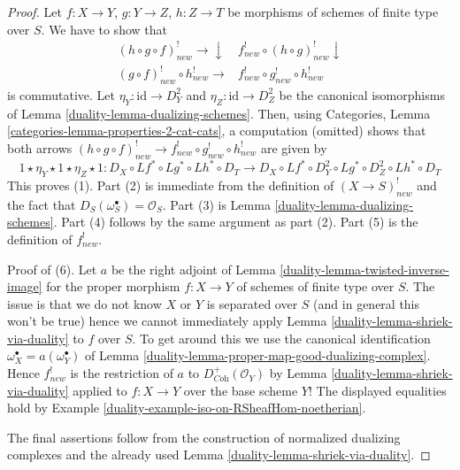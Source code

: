 \begin{proof}

Let $f : X \to Y$, $g : Y \to Z$, $h : Z \to T$ be morphisms of schemes
of finite type over $S$. We have to show that
$$
\begin{array}{cc}(h \circ g \circ f)^!_{new} \longrightarrow\downarrow & f^!_{new} \circ (h \circ g)^!_{new} \downarrow \\ (g \circ f)^!_{new} \circ h^!_{new} \longrightarrow & f^!_{new} \circ g^!_{new} \circ h^!_{new}\end{array}
$$
is commutative. Let $\eta_Y : \text{id} \to D_Y^2$
and $\eta_Z : \text{id} \to D_Z^2$ be the canonical isomorphisms
of Lemma \ref{duality-lemma-dualizing-schemes}. Then, using
Categories, Lemma \ref{categories-lemma-properties-2-cat-cats},
a computation (omitted) shows that both arrows
$(h \circ g \circ f)^!_{new} \to f^!_{new} \circ g^!_{new} \circ h^!_{new}$
are given by
$$
1 \star \eta_Y \star 1 \star \eta_Z \star 1 :
D_X \circ Lf^* \circ Lg^* \circ Lh^* \circ D_T
\longrightarrow
D_X \circ Lf^* \circ D_Y^2 \circ Lg^* \circ D_Z^2 \circ Lh^* \circ D_T
$$
This proves (1). Part (2) is immediate from the definition of
$(X \to S)^!_{new}$ and the fact that $D_S(\omega_S^\bullet) = \mathcal{O}_S$.
Part (3) is Lemma \ref{duality-lemma-dualizing-schemes}.
Part (4) follows by the same argument as part (2).
Part (5) is the definition of $f^!_{new}$.

\medskip\noindent
Proof of (6). Let $a$ be the
right adjoint of Lemma \ref{duality-lemma-twisted-inverse-image} for the
proper morphism $f : X \to Y$ of schemes of finite type over $S$.
The issue is that we do not know $X$ or $Y$ is
separated over $S$ (and in general this won't be true)
hence we cannot immediately apply
Lemma \ref{duality-lemma-shriek-via-duality} to $f$ over $S$.
To get around this we use the canonical identification
$\omega_X^\bullet = a(\omega_Y^\bullet)$ of
Lemma \ref{duality-lemma-proper-map-good-dualizing-complex}.
Hence $f^!_{new}$ is the restriction of $a$ to
$D_{\textit{Coh}}^+(\mathcal{O}_Y)$ by Lemma \ref{duality-lemma-shriek-via-duality}
applied to $f : X \to Y$ over the base scheme $Y$!
The displayed equalities hold by
Example \ref{duality-example-iso-on-RSheafHom-noetherian}.

\medskip\noindent
The final assertions follow from the construction of normalized
dualizing complexes and the already used Lemma \ref{duality-lemma-shriek-via-duality}.
\end{proof}

